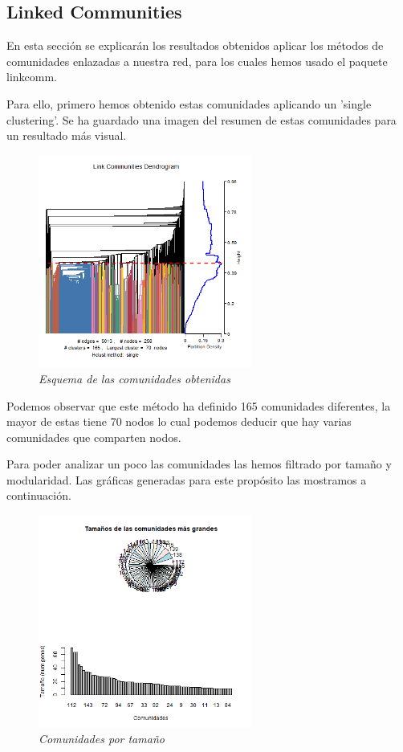 \subsection{Linked Communities}
En esta sección se explicarán los resultados obtenidos aplicar los métodos de comunidades enlazadas a nuestra red, para los cuales hemos usado el paquete linkcomm.

Para ello, primero hemos obtenido estas comunidades aplicando un 'single clustering'. Se ha guardado una imagen del resumen de estas comunidades para un resultado más visual.

\begin{figure}
	\centering
	\includegraphics[width=70mm,scale=1.2]{figures/covid_lc_summary.png}
	\caption{\textit{Esquema de las comunidades obtenidas}}
\end{figure}

Podemos observar que este método ha definido 165 comunidades diferentes, la mayor de estas tiene 70 nodos lo cual podemos deducir que hay varias comunidades que comparten nodos.

Para poder analizar un poco las comunidades las hemos filtrado por tamaño y modularidad. Las gráficas generadas para este propósito las mostramos a continuación.

\begin{figure}
	\centering
	\includegraphics[width=70mm,scale=1.2]{figures/lc_larger_clusters.png}
	\caption{\textit{Comunidades por tamaño}}
\end{figure}

